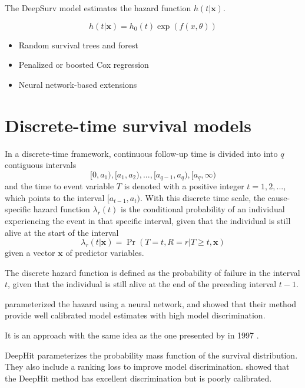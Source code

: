 The DeepSurv model estimates the hazard function \(h(t|\mathbf{x})\).

\begin{equation}
    h(t | \mathbf{x}) = h_0(t) \exp(f(x, \theta))
\end{equation}

\begin{itemize}
    \item Random survival trees and forest
    \item Penalized or boosted Cox regression
    \item Neural network-based extensions
\end{itemize}


\section{Discrete-time survival models}

In a discrete-time framework, 
continuous follow-up time is divided into into \(q\) contiguous intervals
%
\begin{equation*}
	[0, a_1), [a_1, a_2), ..., [a_{q-1}, a_q), [a_{q}, \infty)
\end{equation*}
%
and the time to event variable \(T\) is denoted 
with a positive integer \(t = 1, 2, ...\),
which points to the interval \([a_{t-1}, a_{t})\).
With this discrete time scale,
the cause-specific hazard function \(\lambda_{r}(t)\) is 
the conditional probability of an individual experiencing 
the event in that specific interval,
given that the individual is still alive at the start of the interval
%
\begin{equation*}
    \lambda_{r}(t | \mathbf{x}) = \Pr (T = t, R = r | T \geq t, \mathbf{x})
\end{equation*}
%
given a vector \(\mathbf{x}\) of predictor variables. 

The discrete hazard function is defined as
the probability of failure in the interval \(t\),
given that the individual is still alive at the end of the preceding interval
\(t - 1\).



\citeauthor{gensheimerScalable2019} 
parameterized the hazard using a neural network,
and showed that their method provide well calibrated
model estimates with high model discrimination.

It is an approach with the same idea as the one presented by 
\citeauthor{brownUse1997} in 1997 \autocite{brownUse1997}.


DeepHit parameterizes the probability mass function 
of the survival distribution.
They also include a ranking loss to improve model discrimination.
\citeauthor{kvammeContinuous2021} showed that the DeepHit method
has excellent discrimination but is poorly calibrated.


